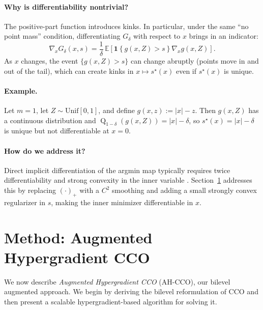 \documentclass{uai2026} %
\theoremstyle{plain}
\theoremstyle{definition}
\newcommand{\Q}{\operatorname{Q}}
\begin{document}
\paragraph{Why is differentiability nontrivial?}
The positive-part function introduces kinks.
In particular, under the same ``no point mass'' condition, differentiating $G_\delta$ with respect to $x$ brings in an indicator:
\[
  \nabla_x G_\delta(x,s)
  =
  \frac{1}{\delta}\,\mathbb{E}\!\left[\mathbf{1}\!\left\{g(x,Z)>s\right\}\nabla_x g(x,Z)\right].
\]
As $x$ changes, the event $\{g(x,Z)>s\}$ can change abruptly (points move in and out of the tail), which can create kinks in $x\mapsto s^\star(x)$ even if $s^\star(x)$ is unique.
\paragraph{Example.}
Let $m=1$, let $Z\sim\mathrm{Unif}[0,1]$, and define $g(x,z):=|x|-z$.
Then $g(x,Z)$ has a continuous distribution and $\Q_{1-\delta}(g(x,Z))=|x|-\delta$, so $s^\star(x)=|x|-\delta$ is unique but not differentiable at $x=0$.

\paragraph{How do we address it?}
Direct implicit differentiation of the argmin map typically requires twice differentiability and strong convexity in the inner variable \citep{gould2016argmin,pedregosa2016hyperparameter}.
Section~\ref{sec:method} addresses this by replacing $(\cdot)_+$ with a $C^2$ smoothing and adding a small strongly convex regularizer in $s$, making the inner minimizer differentiable in $x$.

\section{Method: Augmented Hypergradient CCO}\label{sec:method}
We now describe \emph{Augmented Hypergradient CCO} (AH-CCO), our bilevel augmented approach.
We begin by deriving the bilevel reformulation of CCO and then present a scalable hypergradient-based algorithm for solving it.
\end{document}
